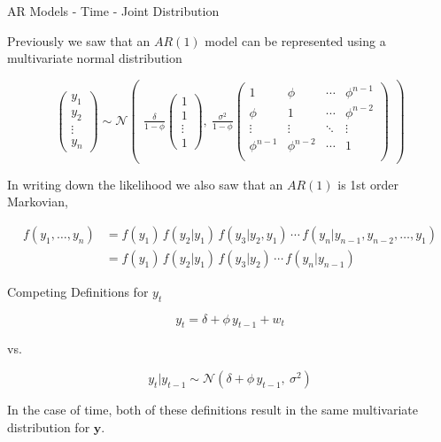 \documentclass[11pt,ignorenonframetext,]{beamer}
\begin{document}
\begin{frame}[t]{AR Models - Time - Joint Distribution}

Previously we saw that an \(AR(1)\) model can be represented using a
multivariate normal distribution

\[
\begin{pmatrix}
y_1 \\ y_2 \\ \vdots \\ y_n
\end{pmatrix}
\sim \mathcal{N} \begin{pmatrix}
\frac{\delta}{1-\phi} \begin{pmatrix}1\\ 1\\ \vdots\\ 1\end{pmatrix},~
\frac{\sigma^2}{1-\phi}
\begin{pmatrix}
1      & \phi   & \cdots & \phi^{n-1} \\
\phi   & 1      & \cdots & \phi^{n-2} \\
\vdots & \vdots & \ddots & \vdots     \\
\phi^{n-1} & \phi^{n-2}  & \cdots & 1 \\
\end{pmatrix}
\end{pmatrix}
\]

\pause

\vspace{4mm}

In writing down the likelihood we also saw that an \(AR(1)\) is 1st
order Markovian,

\[ \begin{aligned}
f(y_1, \ldots, y_n) 
  &= f(y_1) \, f(y_2 | y_1) \,  f(y_3|y_2,y_1) \,\cdots\, f(y_n|y_{n-1},y_{n-2},\ldots,y_1) \\
  &= f(y_1) \, f(y_2 | y_1) \,  f(y_3|y_2) \,\cdots\, f(y_n|y_{n-1})
\end{aligned} \]

\end{frame}

\begin{frame}{Competing Definitions for \(y_t\)}

\Large

\[ y_t = \delta + \phi \, y_{t-1} + w_t \]

\vspace{2mm}

\begin{center}vs.\end{center}

\vspace{2mm}

\[ y_t | y_{t-1} \sim \mathcal{N}(\delta + \phi \, y_{t-1},~\sigma^2) \]

\pause

\vspace{3mm}

In the case of time, both of these definitions result in the same
multivariate distribution for \(\bm{y}\).

\end{frame}
\end{document}
